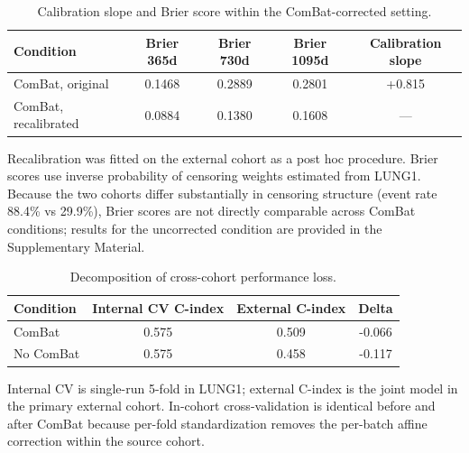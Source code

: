 \documentclass[a4paper,fleqn]{cas-sc}
\begin{document}
\begin{table}[htbp]
\centering
\small
\setlength{\tabcolsep}{4pt}
\caption{Calibration slope and Brier score within the ComBat-corrected setting.}
\label{tbl:3}
\begin{tabular}{@{}lcccc@{}}
\toprule
Condition & Brier 365d & Brier 730d & Brier 1095d & Calibration slope \\
\midrule
ComBat, original & 0.1468 & 0.2889 & 0.2801 & +0.815 \\
ComBat, recalibrated & 0.0884 & 0.1380 & 0.1608 & --- \\
\bottomrule
\end{tabular}
\par\medskip\noindent\footnotesize Recalibration was fitted on the external cohort as a post hoc procedure. Brier scores use inverse probability of censoring weights estimated from LUNG1. Because the two cohorts differ substantially in censoring structure (event rate 88.4\% vs 29.9\%), Brier scores are not directly comparable across ComBat conditions; results for the uncorrected condition are provided in the Supplementary Material.
\end{table}

\begin{table}[htbp]
\centering
\small
\setlength{\tabcolsep}{4pt}
\caption{Decomposition of cross-cohort performance loss.}
\label{tbl:4}
\begin{tabular}{@{}lccc@{}}
\toprule
Condition & Internal CV C-index & External C-index & Delta \\
\midrule
ComBat & 0.575 & 0.509 & -0.066 \\
No ComBat & 0.575 & 0.458 & -0.117 \\
\bottomrule
\end{tabular}
\par\medskip\noindent\footnotesize Internal CV is single-run 5-fold in LUNG1; external C-index is the joint model in the primary external cohort. In-cohort cross-validation is identical before and after ComBat because per-fold standardization removes the per-batch affine correction within the source cohort.
\end{table}
\end{document}
